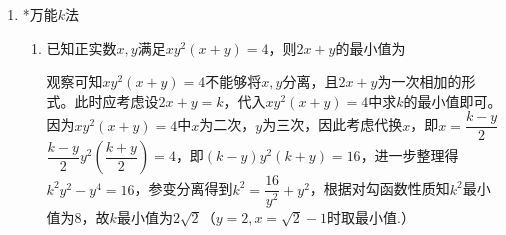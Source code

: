 \begin{enumerate}
\begin{enumerate}
        \item 函数$y = 4\sqrt{x-2} + \sqrt{9-3x}$的最大值为
        \begin{jieda}
            \begin{enumerate}
                \item 利用柯西不等式 \\
                $y = 4\sqrt{x-2} + \sqrt{9-3x} = 4\sqrt{x-2} + \sqrt{3}\sqrt{3-x}$，利用柯西不等式（$(a^2+b^2)\cdot(c^2+d^2) \geq (ac+bd)^2$）有$y \leq \sqrt{(16+3) \cdot (x-2 + 3-x)} = \sqrt{19}$，在$\sqrt{3}\sqrt{3-x} = 4\sqrt{x-2}$时，即$x = \dfrac{54}{19}$时取等（在定义域$[2,3]$内）
                \item 数形结合 \\
                 设$a = 4\sqrt{x-2}, b = \sqrt{9-3x} (a \in [0, 4], b \in [0, \sqrt{3}])$，则两者满足$3a^2 + 16b^2 = 48$，即$\dfrac{a^2}{16} + \dfrac{b^2}{3} = 1$，为一椭圆方程($a$为横坐标，$b$为纵坐标)。$y = a+b$为一直线方程($a$为横坐标，$b$为纵坐标)，故$y$取最大值的时候为直线和椭圆相切。故此处可以采用隐函数求导的方式得到$(a_0, b_0)$处的切线方程：$\dfrac{2a_0a}{16} + \dfrac{2b_0b}{3} = 1$，故当斜率为$-1$时$3a_0 = 16b_0$，代入椭圆方程得到$b_0 = \dfrac{3}{\sqrt{19}}$，故$a_0 = \dfrac{16}{\sqrt{19}}$，因此$y = a_0 + b_0 = \sqrt{19}$ \\
                 也可以设$c = 4\sqrt{3}\sqrt{x-2}, d = 4\sqrt{9-3x}$，满足$c^2+d^2 = 48, y = \dfrac{c}{\sqrt{3}} + \dfrac{d}{4}$.\\
                $y$取最大值的时候为直线和圆相切。故利用点到直线的距离公式有$\sqrt{48} = \dfrac{y}{\sqrt{\dfrac{1}{3} + \dfrac{1}{16}}}$，\\
                即$y = \sqrt{48} \cdot \sqrt{\dfrac{19}{48}} = \sqrt{19}$
            \end{enumerate}
        \end{jieda}
    \end{enumerate}
    \item *万能$k$法
    \begin{enumerate}
        \item 已知正实数$x, y$满足$xy^2(x+y) = 4$，则$2x+y$的最小值为
        \begin{jieda}
            观察可知$xy^2(x+y) = 4$不能够将$x, y$分离，且$2x+y$为一次相加的形式。此时应考虑设$2x+y = k$，代入$xy^2(x+y) = 4$中求$k$的最小值即可。因为$xy^2(x+y) = 4$中$x$为二次，$y$为三次，因此考虑代换$x$，即$x = \dfrac{k-y}{2}$ \\
            $\dfrac{k-y}{2}y^2(\dfrac{k+y}{2}) = 4$，即$(k-y)y^2(k+y) = 16$，进一步整理得$k^2y^2 - y^4 = 16$，参变分离得到$k^2 = \dfrac{16}{y^2} + y^2$，根据对勾函数性质知$k^2$最小值为8，故$k$最小值为$2\sqrt{2}$（$y = 2, x = \sqrt{2}-1$时取最小值.）

\end{jieda}
\end{enumerate}
\end{enumerate}
